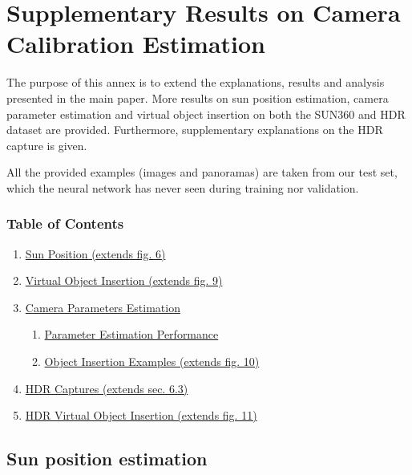 \chapter{Supplementary Results on Camera Calibration Estimation}     %
\label{annex4}

\graphicspath{{annex4_figures/}}

The purpose of this annex is to extend the explanations, results and
analysis presented in the main paper. More results on sun position
estimation, camera parameter estimation and virtual object insertion on
both the SUN360 and HDR dataset are provided. Furthermore, supplementary
explanations on the HDR capture is given.

All the provided examples (images and panoramas) are taken from our test
set, which the neural network has never seen during training nor
validation.

\hypertarget{table-of-contents}{%
\subsection{Table of Contents}\label{table-of-contents}}

\begin{enumerate}
\tightlist
\item
  \protect\hyperlink{sunpos}{Sun Position (extends fig. 6)}
\item
  \protect\hyperlink{virtualobjectinsert}{Virtual Object Insertion
  (extends fig. 9)}
\item
  \protect\hyperlink{camparameval}{Camera Parameters Estimation}

  \begin{enumerate}
  \tightlist
  \item
    \protect\hyperlink{camparamestimperf}{Parameter Estimation
    Performance}
  \item
    \protect\hyperlink{camparaminsertionex}{Object Insertion Examples
    (extends fig. 10)}
  \end{enumerate}
\item
  \protect\hyperlink{HDRcaptures}{HDR Captures (extends sec. 6.3)}
\item
  \protect\hyperlink{virtualobjectinsertHDR}{HDR Virtual Object
  Insertion (extends fig. 11)}
\end{enumerate}

\protect\hypertarget{sunpos}{}{}

\hypertarget{sun-position-estimation}{%
\section{Sun position estimation}\label{sun-position-estimation}}

